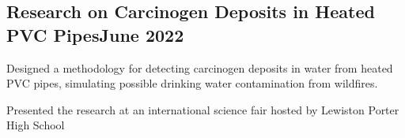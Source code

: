 \documentclass[a4paper, 12pt]{article}
\begin{document}
\vspace*{10pt}
\subsection {{Research on Carcinogen Deposits in Heated PVC Pipes}\hfill June 2022}
\begin{zitemize}
\item Designed a methodology for detecting carcinogen deposits in water from heated PVC pipes, simulating possible drinking water contamination from wildfires.  
\item Presented the research at an international science fair hosted by Lewiston Porter High School 
\end{zitemize}
\end{document}

